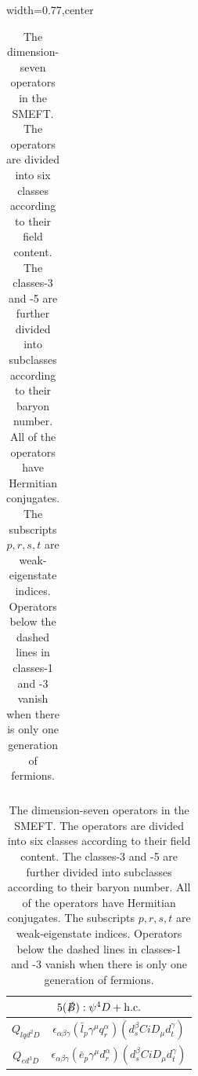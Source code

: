 \begin{table}[H]
\begin{center}
\begin{adjustbox}{width=0.77\textwidth,center}
\begin{minipage}[t]{5.6cm}
\begin{tabular}[t]{c|c}
\end{tabular}
\end{minipage}
%
\hspace{1cm}
\begin{minipage}[t]{5.0cm}
\renewcommand{\arraystretch}{1.5}
\begin{tabular}[t]{c|c}
\multicolumn{2}{c}{\boldmath$5(\slashed{B}):\psi^4D+\mathrm{h.c.}$} \\
\hline
$Q_{lqd^2D}$   & $\epsilon_{\alpha\beta\gamma} (\bar{l}_p \gamma^\mu q_r^\alpha) (d_s^\beta C i D_\mu d_t^\gamma)$ \\
$Q_{ed^3D}$  & $\epsilon_{\alpha\beta\gamma} (\bar{e}_p \gamma^\mu d_r^\alpha) (d_s^\beta C i D_\mu d_t^\gamma)$ 
\end{tabular}
\end{minipage}
\end{adjustbox}
%
\end{center}
\caption{The dimension-seven operators in the SMEFT. The operators are divided into six classes according to their field content. The classes-3 and -5 are further divided into subclasses according to their baryon number. All of the operators have Hermitian conjugates. The subscripts $p, r, s, t$ are weak-eigenstate indices. Operators below the dashed lines in classes-1 and -3 vanish when there is only one generation of fermions.}
\label{tab:smeft7ops}
\end{table}


